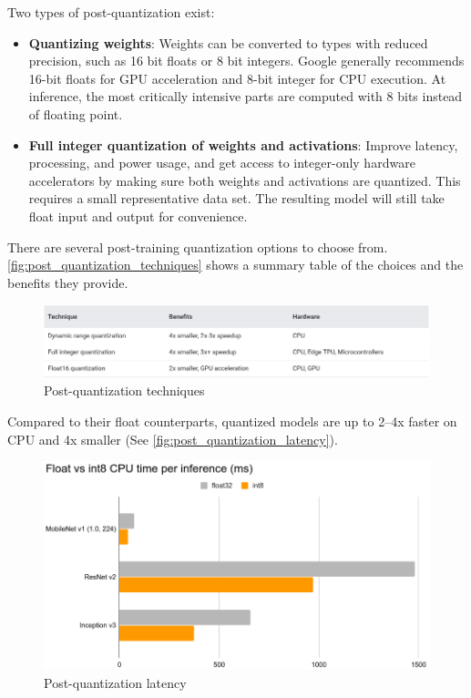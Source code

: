 Two types of post-quantization exist:
\begin{itemize}
    \item \textbf{Quantizing weights}: Weights can be converted to types with
        reduced precision, such as 16 bit floats or 8 bit integers. Google
        generally recommends 16-bit floats for GPU acceleration and 8-bit
        integer for CPU execution. At inference, the most critically intensive
        parts are computed with 8 bits instead of floating point.
    \item \textbf{Full integer quantization of weights and activations}:
        Improve latency, processing, and power usage, and get access to
        integer-only hardware accelerators by making sure both weights and
        activations are quantized.  This requires a small representative data
        set. The resulting model will still take float input and output for
        convenience.
\end{itemize}

There are several post-training quantization options to choose from.
\autoref{fig:post_quantization_techniques} shows a summary table of the choices
and the benefits they provide.~\cite{tfmot:quantization_post_training}

\begin{figure}[ht]
    \includegraphics[width=\textwidth]{images/introduction/post_quantization_techniques.png}
    \centering
    \caption{Post-quantization techniques}\label{fig:post_quantization_techniques}
\end{figure}

Compared to their float counterparts, quantized models are up to 2–4x faster on
CPU and 4x smaller (See \autoref{fig:post_quantization_latency}).

\begin{figure}[ht]
    \includegraphics[width=\textwidth]{images/introduction/post_quantization_latency.png}
    \centering
    \caption{Post-quantization latency}\label{fig:post_quantization_latency}
\end{figure}


